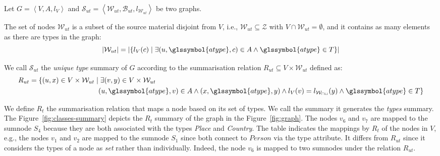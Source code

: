 \begin{definition}
Let $G=\left\langle V, A, l_V \right\rangle$ and $\mathcal{S}_{ut} = \left\langle \mathcal{W}_{ut}, \mathcal{B}_{ut}, l_{\mathcal{W}_{ut}} \right\rangle$ be two graphs.

The set of nodes $\mathcal{W}_{ut}$ is a subset of the source material disjoint from $V$, i.e., $\mathcal{W}_{ut} \subseteq \mathcal{Z}$ with $V \cap \mathcal{W}_{ut} = \emptyset$, and it contains as many elements as there are types in the graph:
$$
\lvert \mathcal{W}_{ut} \rvert = \lvert \left\lbrace l_V(c) \mid \exists (u, \glssymbol{atype}, c) \in A \wedge \glssymbol{atype} \in T \right\rbrace \rvert
$$

We call $\mathcal{S}_{ut}$ the \emph{unique type} summary of $G$ according to the summarisation relation $R_{ut} \subseteq V \times \mathcal{W}_{ut}$ defined as:
$$
\begin{aligned}
R_{ut} = \{ (u, x) \in V \times \mathcal{W}_{ut} \mid &\; \exists (v, y) \in V \times \mathcal{W}_{ut} \\
	& (u,\glssymbol{atype},v) \in A \wedge (x,\glssymbol{atype},y) \wedge l_V(v) = l_\mathcal{W_{ut}}(y) \wedge \glssymbol{atype} \in T \}
\end{aligned}
$$
\label{def:st}
\end{definition}
\vspace{.5cm}


We define $R_t$ the summarisation relation that maps a node based on its set of types. We call the summary it generates the \emph{types} summary.
The Figure~\ref{fig:classes-summary} depicts the $R_t$ summary of the graph in the Figure~\ref{fig:graph}. The nodes $v_6$ and $v_7$ are mapped to the sumnode $S_4$ because they are both associated with the types \emph{Place} and \emph{Country}. The table indicates the mappings by $R_t$ of the nodes in $V$, e.g., the nodes $v_1$ and $v_2$ are mapped to the sumnode $S_1$ since both connect to $Person$ via the type attribute. It differs from $R_{ut}$ since it considers the types of a node as \emph{set} rather than individually. Indeed, the node $v_6$ is mapped to two sumnodes under the relation $R_{ut}$.

